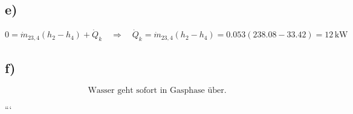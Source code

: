 

\subsection*{e)}

\[
0 = \dot{m}_{23,4} (h_2 - h_4) + \dot{Q}_k \quad \Rightarrow \quad \dot{Q}_k = \dot{m}_{23,4} (h_2 - h_4) = 0.053 \left( 238.08 - 33.42 \right) = 12 \, \text{kW}
\]

\subsection*{f)}

\[
\text{Wasser geht sofort in Gasphase über.}
\]

```